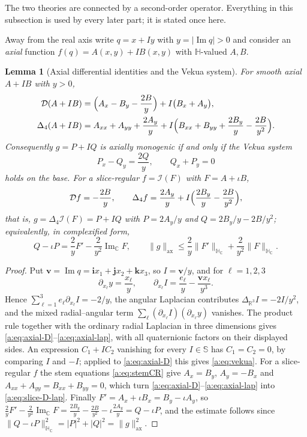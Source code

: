 \documentclass[11pt,a4paper]{article}
\numberwithin{equation}{section}
\newtheorem{lemma}[theorem]{Lemma}
\theoremstyle{definition}
\theoremstyle{remark}
\theoremstyle{plain}
\newcommand{\HH}{\mathbb H}
\newcommand{\HC}{\mathbb H_{\mathbb C}}
\newcommand{\RR}{\mathbb R}
\newcommand{\CC}{\mathbb C}
\newcommand{\SSS}{\mathbb S}
\DeclareMathOperator{\Ima}{Im}
\newcommand{\Dop}{\mathcal D}
\newcommand{\lap}{\Delta_4}
\newcommand{\I}{\mathcal I}
\newcommand{\axn}[1]{\lVert #1\rVert_{\mathrm{ax}}}   %
\newcommand{\abs}[1]{\lvert #1\rvert}
\newcommand{\norm}[1]{\lVert #1\rVert}
\begin{document}
The two theories are connected by a second-order operator. Everything in this
subsection is used by every later part; it is stated once here.

Away from the real axis write $q=x+Iy$ with $y=\abs{\Ima q}>0$ and consider an
\emph{axial} function $f(q)=A(x,y)+IB(x,y)$ with $\HH$-valued $A,B$.

\begin{lemma}[Axial differential identities and the Vekua system]
\label{a:lem:axial}
For smooth axial $A+IB$ with $y>0$,
\begin{align}
 \Dop(A+IB)&=\Bigl(A_x-B_y-\frac{2B}{y}\Bigr)+I\bigl(B_x+A_y\bigr),
 \label{a:eq:axial-D}\\
 \lap(A+IB)&=A_{xx}+A_{yy}+\frac{2A_y}{y}
  +I\Bigl(B_{xx}+B_{yy}+\frac{2B_y}{y}-\frac{2B}{y^2}\Bigr).
 \label{a:eq:axial-lap}
\end{align}
Consequently $g=P+IQ$ is axially monogenic if and only if the
\emph{Vekua system}
\begin{equation}
 P_x-Q_y=\frac{2Q}{y},\qquad Q_x+P_y=0
 \label{a:eq:vekua}
\end{equation}
holds on the base. For a slice-regular $f=\I(F)$ with $F=A+\iota B$,
\begin{equation}
 \Dop f=-\frac{2B}{y},\qquad
 \lap f=\frac{2A_y}{y}+I\Bigl(\frac{2B_y}{y}-\frac{2B}{y^2}\Bigr),
 \label{a:eq:slice-D-lap}
\end{equation}
that is, $g=\lap\I(F)=P+IQ$ with $P=2A_y/y$ and $Q=2B_y/y-2B/y^2$;
equivalently, in complexified form,
\begin{equation}
 Q-\iota P=\frac2yF'-\frac2{y^2}\Ima_{\CC}F,
 \qquad
 \axn g\le\frac2y\norm{F'}_{\HC}+\frac2{y^2}\norm{F}_{\HC}.
 \label{a:eq:Fu-first}
\end{equation}
\end{lemma}

\begin{proof}
Put $\mathbf v=\Ima q=\mathbf ix_1+\mathbf jx_2+\mathbf kx_3$, so
$I=\mathbf v/y$, and for $\ell=1,2,3$
\[
 \partial_{x_\ell}y=\frac{x_\ell}{y},\qquad
 \partial_{x_\ell}I=\frac{e_\ell}{y}-\frac{\mathbf vx_\ell}{y^3}.
\]
Hence $\sum_{\ell=1}^3e_\ell\partial_{x_\ell}I=-2/y$, the angular Laplacian
contributes $\Delta_{\RR^3}I=-2I/y^2$, and the mixed radial--angular term
$\sum_\ell(\partial_{x_\ell}I)(\partial_{x_\ell}y)$ vanishes. The product rule
together with the ordinary radial Laplacian in three dimensions gives
\eqref{a:eq:axial-D}--\eqref{a:eq:axial-lap}, with all quaternionic factors on
their displayed sides. An expression $C_1+IC_2$ vanishing for every $I\in\SSS$
has $C_1=C_2=0$, by comparing $I$ and $-I$; applied to \eqref{a:eq:axial-D}
this gives \eqref{a:eq:vekua}. For a slice-regular $f$ the stem equations
\eqref{a:eq:stemCR} give $A_x=B_y$, $A_y=-B_x$ and
$A_{xx}+A_{yy}=B_{xx}+B_{yy}=0$, which turn
\eqref{a:eq:axial-D}--\eqref{a:eq:axial-lap} into
\eqref{a:eq:slice-D-lap}. Finally $F'=A_x+\iota B_x=B_y-\iota A_y$, so
$\tfrac2yF'-\tfrac2{y^2}\Ima_\CC F
=\tfrac{2B_y}{y}-\tfrac{2B}{y^2}-\iota\tfrac{2A_y}{y}=Q-\iota P$, and the
estimate follows since $\norm{Q-\iota P}_{\HC}^2=\abs P^2+\abs Q^2=\axn g^2$.
\end{proof}
\end{document}
